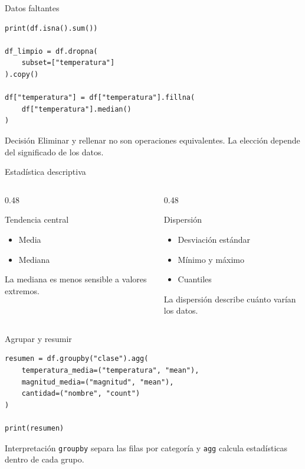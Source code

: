 \documentclass[10pt]{beamer}
\begin{document}
\begin{frame}[fragile]{Datos faltantes}
\begin{verbatim}
print(df.isna().sum())

df_limpio = df.dropna(
    subset=["temperatura"]
).copy()

df["temperatura"] = df["temperatura"].fillna(
    df["temperatura"].median()
)
\end{verbatim}

  \begin{block}{Decisión}
    Eliminar y rellenar no son operaciones equivalentes. La elección depende del significado de los datos.
  \end{block}
\end{frame}

\begin{frame}{Estadística descriptiva}
  \begin{columns}
    \begin{column}{0.48\textwidth}
      \begin{block}{Tendencia central}
        \begin{itemize}
          \item Media
          \item Mediana
        \end{itemize}
      \end{block}

      La mediana es menos sensible a valores extremos.
    \end{column}
    \begin{column}{0.48\textwidth}
      \begin{block}{Dispersión}
        \begin{itemize}
          \item Desviación estándar
          \item Mínimo y máximo
          \item Cuantiles
        \end{itemize}
      \end{block}

      La dispersión describe cuánto varían los datos.
    \end{column}
  \end{columns}
\end{frame}

\begin{frame}[fragile]{Agrupar y resumir}
\begin{verbatim}
resumen = df.groupby("clase").agg(
    temperatura_media=("temperatura", "mean"),
    magnitud_media=("magnitud", "mean"),
    cantidad=("nombre", "count")
)

print(resumen)
\end{verbatim}

  \begin{block}{Interpretación}
    \texttt{groupby} separa las filas por categoría y \texttt{agg} calcula estadísticas dentro de cada grupo.
  \end{block}
\end{frame}
\end{document}
